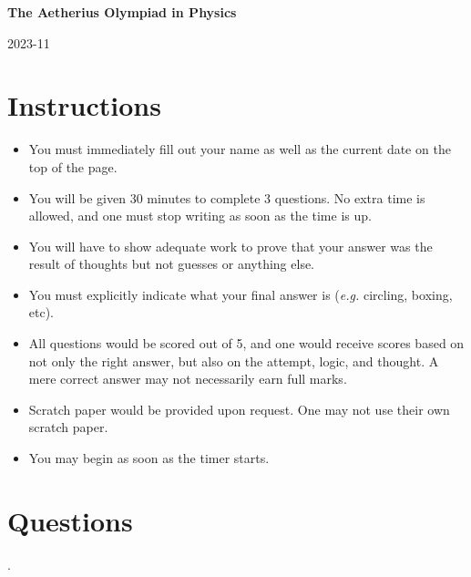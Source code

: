 \documentclass{exam}
\begin{document}
\begin{center}
    \LARGE{\textbf{The Aetherius Olympiad in Physics}}

    \vspace{8pt}

    \large{2023-11}
\end{center}

\section*{Instructions}
\begin{itemize}
    \item You must immediately fill out your name as well as the current date on the top of the page.
    \item You will be given 30 minutes to complete 3 questions. No extra time is allowed, and one must stop writing as soon as the time is up.
    \item You will have to show adequate work to prove that your answer was the result of thoughts but not guesses or anything else.
    \item You must explicitly indicate what your final answer is (\textit{e.g.} circling, boxing, etc).
    \item All questions would be scored out of 5, and one would receive scores based on not only the right answer, but also on the attempt, logic, and thought. A mere correct answer may not necessarily earn full marks.
    \item Scratch paper would be provided upon request. One may not use their own scratch paper.
    \item You may begin as soon as the timer starts.
\end{itemize}

\section*{Questions}

\begin{questions}
    .

    \pagebreak


    \pagebreak

\end{questions}
\end{document}
